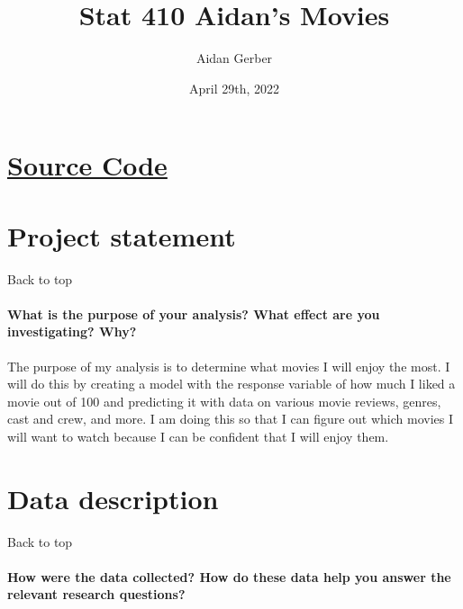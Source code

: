 \documentclass[
]{article}
\title{Stat 410 Aidan's Movies}
\author{Aidan Gerber}
\date{April 29th, 2022}
\begin{document}
\maketitle

{
\setcounter{tocdepth}{3}
\tableofcontents
}
\doublespacing

\hypertarget{source-code}{%
\section{\texorpdfstring{\href{https://github.com/AidanG1/stat410}{Source
Code}}{Source Code}}\label{source-code}}

\hypertarget{project-statement}{%
\section{Project statement}\label{project-statement}}

Back to top

\hypertarget{what-is-the-purpose-of-your-analysis-what-effect-are-you-investigating-why}{%
\paragraph{What is the purpose of your analysis? What effect are you
investigating?
Why?}\label{what-is-the-purpose-of-your-analysis-what-effect-are-you-investigating-why}}

The purpose of my analysis is to determine what movies I will enjoy the
most. I will do this by creating a model with the response variable of
how much I liked a movie out of 100 and predicting it with data on
various movie reviews, genres, cast and crew, and more. I am doing this
so that I can figure out which movies I will want to watch because I can
be confident that I will enjoy them.

\hypertarget{data-description}{%
\section{Data description}\label{data-description}}

Back to top

\hypertarget{how-were-the-data-collected-how-do-these-data-help-you-answer-the-relevant-research-questions}{%
\paragraph{How were the data collected? How do these data help you
answer the relevant research
questions?}\label{how-were-the-data-collected-how-do-these-data-help-you-answer-the-relevant-research-questions}}
\end{document}
